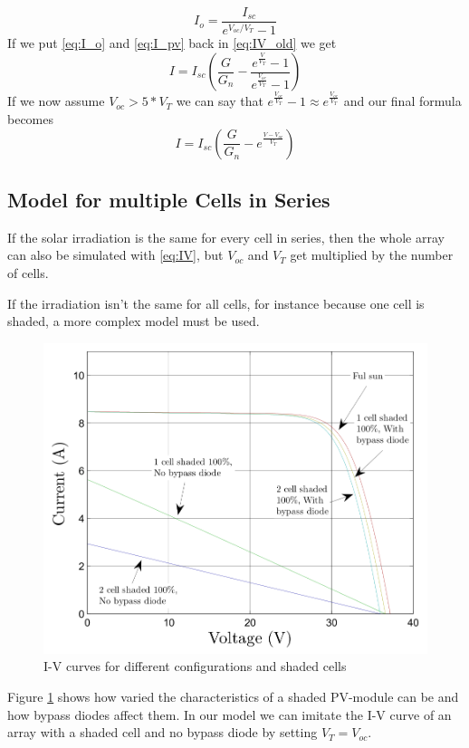 \begin{equation} \label{eq:I_o}
    I_o = \frac{I_{sc}}{e^{V_{oc} / V_T} - 1}
\end{equation}
If we put \eqref{eq:I_o} and \eqref{eq:I_pv}  back  in  \eqref{eq:IV_old} we get
\begin{equation}
    I = I_{sc} \left( \frac{G}{G_n} - \frac{e^{\frac{V}{V_T}}-1}{e^{\frac{V_{oc}}{V_T}}-1} \right)
\end{equation}
If we now assume $V_{oc} >  5  *  V_T$ we can say that $e^{\frac{V_{oc}}{V_T}}-1
\approx e^{\frac{V_{oc}}{V_T}}$ and our final formula becomes
\begin{equation} \label{eq:IV}
    I = I_{sc} \left( \frac{G}{G_n} - e^{\frac{V - V_{oc}}{V_T}} \right)
\end{equation}


\subsection{Model for multiple Cells in Series}

If  the  solar irradiation is the same for every cell in series, then the  whole
array  can  also  be  simulated  with  \eqref{eq:IV}, but $V_{oc}$ and $V_T$ get
multiplied by the number of cells.

If  the  irradiation isn't the same for all cells, for instance because one cell
is shaded, a more complex model must be used.
\begin{figure}[h]
	\center
    \includegraphics[width=.5\textwidth]{images/model/shaded.png}
    \caption{I-V curves for different configurations and shaded cells\cite{ref:tian:model}}
    \label{fig:model:shaded}
\end{figure}

Figure \ref{fig:model:shaded} shows how  varied  the characteristics of a shaded
PV-module can be and how bypass diodes affect them. In our model  we can imitate
the I-V curve of an array with a shaded cell and no bypass diode by setting $V_T
= V_{oc}$.

